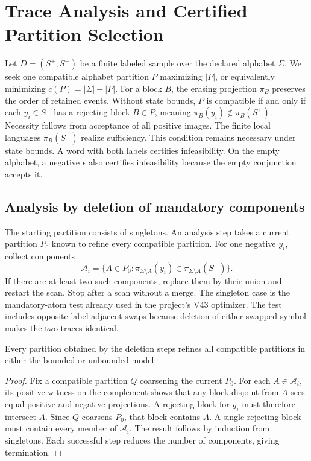 \section{Trace Analysis and Certified Partition Selection}
\label{sec:guided-selection}

Let \(D=(S^+,S^-)\) be a finite labeled sample over the declared alphabet
\(\Sigma\). We seek one compatible alphabet partition \(P\) maximizing
\(|P|\), or equivalently minimizing \(c(P)=|\Sigma|-|P|\).
For a block \(B\), the erasing projection \(\pi_B\) preserves the order
of retained events. Without state bounds, \(P\) is compatible if and
only if each \(y_i\in S^-\) has a rejecting block \(B\in P\), meaning
\(\pi_B(y_i)\notin\pi_B(S^+)\). Necessity follows from acceptance of all
positive images. The finite local languages \(\pi_B(S^+)\) realize
sufficiency. This condition remains necessary under state bounds.
A word with both labels certifies infeasibility. On the empty alphabet,
a negative \(\epsilon\) also certifies infeasibility because the empty
conjunction accepts it.

\subsection{Analysis by deletion of mandatory components}

The starting partition consists of singletons. An analysis step
takes a current partition \(P_0\) known to refine every compatible
partition. For one negative \(y_i\), collect components
\[
  \mathcal A_i =
  \{ A\in P_0 : \pi_{\Sigma\setminus A}(y_i)
                       \in \pi_{\Sigma\setminus A}(S^+)\}.
\]
If there are at least two such components, replace them by their
union and restart the scan. Stop after a scan without a merge.
The singleton case is the mandatory-atom test already used in the
project's V43 optimizer. The test includes opposite-label adjacent
swaps because deletion of either swapped symbol makes the two traces
identical.

\begin{lemma}
Every partition obtained by the deletion steps refines all compatible
partitions in either the bounded or unbounded model.
\end{lemma}
\begin{proof}
Fix a compatible partition \(Q\) coarsening the current \(P_0\).
For each \(A\in\mathcal A_i\), its positive witness on the complement
shows that any block disjoint from \(A\) sees equal positive and
negative projections. A rejecting block for \(y_i\) must therefore
intersect \(A\). Since \(Q\) coarsens \(P_0\), that block contains \(A\).
A single rejecting block must contain every member of \(\mathcal A_i\).
The result follows by induction from singletons. Each successful step
reduces the number of components, giving termination.
\end{proof}

